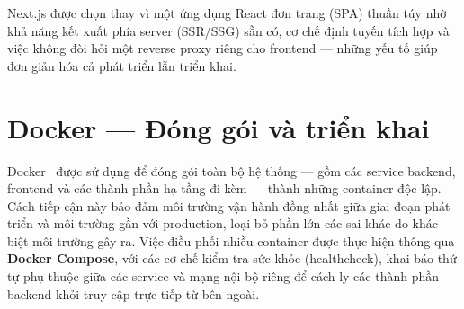 \documentclass[../DoAn.tex]{subfiles}
\begin{document}
Next.js được chọn thay vì một ứng dụng React đơn trang (SPA) thuần túy nhờ khả năng kết xuất
phía server (SSR/SSG) sẵn có, cơ chế định tuyến tích hợp và việc không đòi hỏi một reverse
proxy riêng cho frontend --- những yếu tố giúp đơn giản hóa cả phát triển lẫn triển khai.



\section{Docker --- Đóng gói và triển khai}
\label{section:3.7}

Docker~\cite{docker_docs} được sử dụng để đóng gói toàn bộ hệ thống --- gồm các service
backend, frontend và các thành phần hạ tầng đi kèm --- thành những container độc lập. Cách
tiếp cận này bảo đảm môi trường vận hành đồng nhất giữa giai đoạn phát triển và môi trường
gần với production, loại bỏ phần lớn các sai khác do khác biệt môi trường gây ra. Việc điều
phối nhiều container được thực hiện thông qua \textbf{Docker Compose}, với các cơ chế kiểm
tra sức khỏe (healthcheck), khai báo thứ tự phụ thuộc giữa các service và mạng nội bộ riêng
để cách ly các thành phần backend khỏi truy cập trực tiếp từ bên ngoài.
\end{document}
